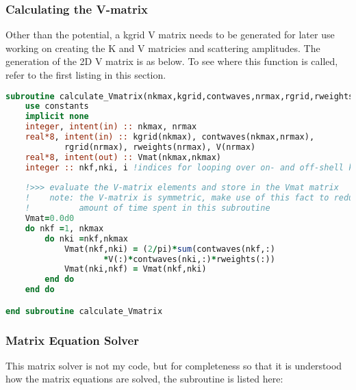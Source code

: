 \documentclass{article}
\begin{document}
    \subsubsection{Calculating the V-matrix}
    \label{CreatingVmat}
    
    Other than the potential, a kgrid V matrix needs to be generated for later use working on creating the K and V matricies and scattering amplitudes.
    The generation of the 2D V matrix is as below. To see where this function is called, refer to the first listing in this section.
    
    \begin{lstlisting}[language=fortran]
subroutine calculate_Vmatrix(nkmax,kgrid,contwaves,nrmax,rgrid,rweights,V,Vmat)
	use constants
	implicit none
	integer, intent(in) :: nkmax, nrmax
	real*8, intent(in) :: kgrid(nkmax), contwaves(nkmax,nrmax), 
			rgrid(nrmax), rweights(nrmax), V(nrmax)
	real*8, intent(out) :: Vmat(nkmax,nkmax)
	integer :: nkf,nki, i !indices for looping over on- and off-shell k
	
	!>>> evaluate the V-matrix elements and store in the Vmat matrix
	!    note: the V-matrix is symmetric, make use of this fact to reduce the 
	!          amount of time spent in this subroutine
	Vmat=0.0d0
	do nkf =1, nkmax
		do nki =nkf,nkmax
			Vmat(nkf,nki) = (2/pi)*sum(contwaves(nkf,:)
					*V(:)*contwaves(nki,:)*rweights(:))
			Vmat(nki,nkf) = Vmat(nkf,nki)
		end do
	end do

end subroutine calculate_Vmatrix
    \end{lstlisting}
    
    \subsubsection{Matrix Equation Solver}
    \label{matrixSolver}
    
    This matrix solver is not my code, but for completeness so that it is understood how the matrix equations are solved, the subroutine is listed here:
    
\end{document}
